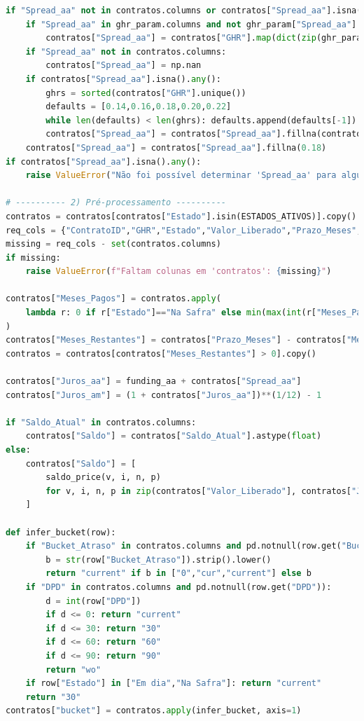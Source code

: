 \documentclass[11pt,a4paper]{article}
\newcommand{\1}{\mathbf{1}}
\begin{document}
\begin{lstlisting}[language=Python, caption={risk_frontier.py (versão completa com normalização por prazo e visões)}]
if "Spread_aa" not in contratos.columns or contratos["Spread_aa"].isna().all():
    if "Spread_aa" in ghr_param.columns and not ghr_param["Spread_aa"].isna().all():
        contratos["Spread_aa"] = contratos["GHR"].map(dict(zip(ghr_param["GHR"], ghr_param["Spread_aa"])))
    if "Spread_aa" not in contratos.columns:
        contratos["Spread_aa"] = np.nan
    if contratos["Spread_aa"].isna().any():
        ghrs = sorted(contratos["GHR"].unique())
        defaults = [0.14,0.16,0.18,0.20,0.22]
        while len(defaults) < len(ghrs): defaults.append(defaults[-1])
        contratos["Spread_aa"] = contratos["Spread_aa"].fillna(contratos["GHR"].map({g:s for g,s in zip(ghrs, defaults)}))
    contratos["Spread_aa"] = contratos["Spread_aa"].fillna(0.18)
if contratos["Spread_aa"].isna().any():
    raise ValueError("Não foi possível determinar 'Spread_aa' para alguns contratos.")

# ---------- 2) Pré-processamento ----------
contratos = contratos[contratos["Estado"].isin(ESTADOS_ATIVOS)].copy()
req_cols = {"ContratoID","GHR","Estado","Valor_Liberado","Prazo_Meses","Meses_Pagos"}
missing = req_cols - set(contratos.columns)
if missing:
    raise ValueError(f"Faltam colunas em 'contratos': {missing}")

contratos["Meses_Pagos"] = contratos.apply(
    lambda r: 0 if r["Estado"]=="Na Safra" else min(max(int(r["Meses_Pagos"]), 0), int(r["Prazo_Meses"])-1), axis=1
)
contratos["Meses_Restantes"] = contratos["Prazo_Meses"] - contratos["Meses_Pagos"]
contratos = contratos[contratos["Meses_Restantes"] > 0].copy()

contratos["Juros_aa"] = funding_aa + contratos["Spread_aa"]
contratos["Juros_am"] = (1 + contratos["Juros_aa"])**(1/12) - 1

if "Saldo_Atual" in contratos.columns:
    contratos["Saldo"] = contratos["Saldo_Atual"].astype(float)
else:
    contratos["Saldo"] = [
        saldo_price(v, i, n, p)
        for v, i, n, p in zip(contratos["Valor_Liberado"], contratos["Juros_am"], contratos["Prazo_Meses"], contratos["Meses_Pagos"])
    ]

def infer_bucket(row):
    if "Bucket_Atraso" in contratos.columns and pd.notnull(row.get("Bucket_Atraso")):
        b = str(row["Bucket_Atraso"]).strip().lower()
        return "current" if b in ["0","cur","current"] else b
    if "DPD" in contratos.columns and pd.notnull(row.get("DPD")):
        d = int(row["DPD"])
        if d <= 0: return "current"
        if d <= 30: return "30"
        if d <= 60: return "60"
        if d <= 90: return "90"
        return "wo"
    if row["Estado"] in ["Em dia","Na Safra"]: return "current"
    return "30"
contratos["bucket"] = contratos.apply(infer_bucket, axis=1)


\end{lstlisting}
\end{document}
